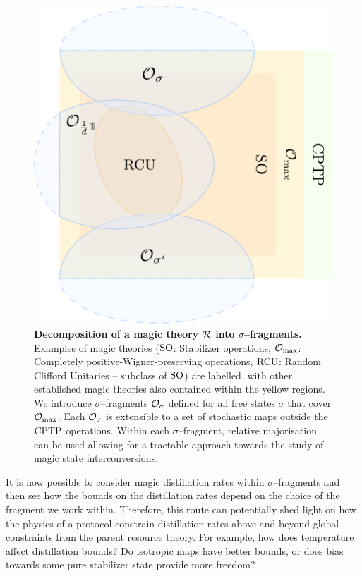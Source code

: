 \documentclass[pra,
aps,
twocolumn,
superscriptaddress,
groupedaddress,
nofootinbib,
reprint
]{revtex4-1}
\begin{document}
\begin{figure}[t]
    \centering
        \includegraphics[scale=0.3]{figs/operations.pdf}
    \caption{\textbf{Decomposition of a magic theory ${\mathcal R}$ into $\sigma$--fragments.} 
	Examples of magic theories (${\rm{SO}}$: Stabilizer operations, ${\mathcal O}_{\rm{max}}$: Completely positive-Wigner-preserving operations, ${\rm{RCU}}$: Random Clifford Unitaries -- subclass of ${\rm{SO}}$) are labelled, with other established magic theories also contained within the yellow regions.
    We introduce $\sigma$--fragments ${\mathcal O}_\sigma$ defined for all free states $\sigma$ that cover ${\mathcal O}_{\rm{max}}$. 
    Each ${\mathcal O}_\sigma$ is extensible to a set of stochastic maps outside the ${\rm{CPTP}}$ operations.
    Within each $\sigma$--fragment, relative majorisation can be used allowing for a tractable approach towards the study of magic state interconversions.
    }
    \label{fig:zoo}
\end{figure}

It is now possible to consider magic distillation rates within $\sigma$--fragments and then see how the bounds on the distillation rates depend on the choice of the fragment we work within. Therefore, this route can potentially shed light on how the physics of a protocol constrain distillation rates above and beyond global constraints from the parent resource theory. For example, how does temperature affect distillation bounds? Do isotropic maps have better bounds, or does bias towards some pure stabilizer state provide more freedom?
\end{document}
